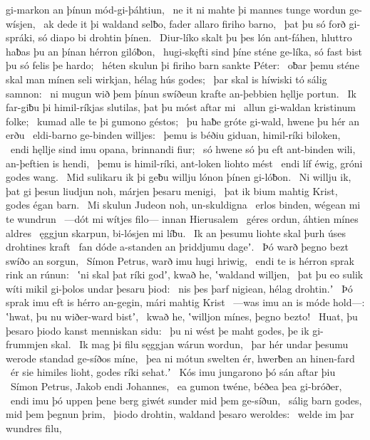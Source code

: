 gi-markon an þínun mód-gi-þáhtiun, \hld\ ne it ni mahte þi mannes tunge
wordun ge-wísjen, \hld\ ak dede it þi waldand selƀo,
fader allaro firiho barno, \hld\ þat þu só forð gi-spráki,
só diapo bi drohtin þínen. \hld\ Diur-líko skalt þu þes lón ant-fáhen,
hluttro haƀas þu an þínan hérron gilóƀon, \hld\ hugi-skęfti sind þíne sténe ge-líka,
só fast bist þu só felis þe hardo; \hld\ héten skulun þi firiho barn
sankte Péter: \hld\ oƀar þemu sténe skal man mínen seli wirkjan,
hélag hús godes; \hld\ þar skal is híwiski tó
sálig samnon: \hld\ ni mugun wið þem þínun swíðeun krafte
an-þebbien hęllje portun. \hld\ Ik far-giƀu þi himil-ríkjas slutilas,
þat þu móst aftar mi \hld\ allun gi-waldan
kristinum folke; \hld\ kumad alle te þi
gumono géstos; \hld\ þu haƀe gróte gi-wald,
hwene þu hér an erðu \hld\ eldi-barno
ge-binden willjes: \hld\ þemu is béðiu giduan,
himil-ríki biloken, \hld\ endi hęllje sind imu opana,
brinnandi fiur; \hld\ só hwene só þu eft ant-binden wili,
an-þeftien is hendi, \hld\ þemu is himil-ríki,
ant-loken liohto mést \hld\ endi líf éwig,
gróni godes wang. \hld\ Mid sulikaru ik þi geƀu willju
lónon þínen gi-lóƀon. \hld\ Ni willju ik, þat gi þesun liudjun noh,
márjen þesaru menigi, \hld\ þat ik bium mahtig Krist,
godes égan barn. \hld\ Mi skulun Judeon noh,
un-skuldigna \hld\ erlos binden,
wégean mi te wundrun \hld\ —dót mi wítjes filo—
innan Hierusalem \hld\ géres ordun,
áhtien mínes aldres \hld\ ęggjun skarpun,
bi-lósjen mi líƀu. \hld\ Ik an þesumu liohte skal
þurh úses drohtines kraft \hld\ fan dóde a-standen
an þriddjumu dageʼ. \hld\ Þó warð þegno bezt
swíðo an sorgun, \hld\ Símon Petrus,
warð imu hugi hriwig, \hld\ endi te is hérron sprak
rink an rúnun: \hld\ ʽni skal þat ríki godʼ, kwað he,
ʽwaldand willjen, \hld\ þat þu eo sulik wíti mikil
gi-þolos undar þesaru þiod: \hld\ nis þes þarf nigiean,
hélag drohtin.ʼ \hld\ Þó sprak imu eft is hérro an-gegin,
mári mahtig Krist \hld\ —was imu an is móde hold—:
ʽhwat, þu nu wiðer-ward bistʼ, \hld\ kwað he, ʽwilljon mínes,
þegno bezto! \hld\ Huat, þu þesaro þiodo kanst
menniskan sidu: \hld\ þu ni wést þe maht godes,
þe ik gi-frummjen skal. \hld\ Ik mag þi filu sęggjan
wárun wordun, \hld\ þar hér undar þesumu werode standad
ge-síðos míne, \hld\ þea ni mótun swelten ér,
hwerƀen an hinen-fard \hld\ ér sie himiles lioht,
godes ríki sehat.ʼ \hld\ Kós imu jungarono þó
sán aftar þiu \hld\ Símon Petrus,
Jakob endi Johannes, \hld\ ea gumon twéne,
béðea þea gi-bróðer, \hld\ endi imu þó uppen þene berg giwét
sunder mid þem ge-síðun, \hld\ sálig barn godes,
mid þem þegnun þrim, \hld\ þiodo drohtin,
waldand þesaro weroldes: \hld\ welde im þar wundres filu,
